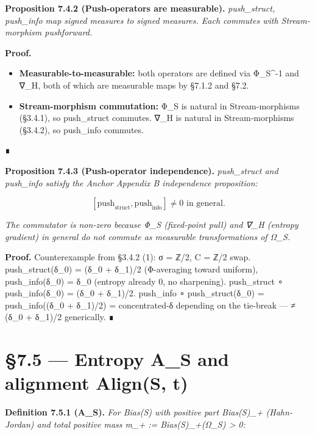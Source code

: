 \documentclass[11pt, openany]{book}
\newcommand{\sectionbreak}{\clearpage}
\begin{document}
\textbf{Proposition 7.4.2 (Push-operators are measurable).} \textit{push\_\allowbreak{}struct, push\_\allowbreak{}info map signed measures to signed measures. Each commutes with Stream-morphism pushforward.}

\textbf{Proof.}
\begin{itemize}
\item \textbf{Measurable-to-measurable:} both operators are defined via Φ\_\allowbreak{}S\textasciicircum{}{-1} and ∇\_\allowbreak{}H, both of which are measurable maps by §7.1.2 and §7.2.
\item \textbf{Stream-morphism commutation:} Φ\_\allowbreak{}S is natural in Stream-morphisms (§3.4.1), so push\_\allowbreak{}struct commutes. ∇\_\allowbreak{}H is natural in Stream-morphisms (§3.4.2), so push\_\allowbreak{}info commutes.
\end{itemize}
∎

\textbf{Proposition 7.4.3 (Push-operator independence).} \textit{push\_\allowbreak{}struct and push\_\allowbreak{}info satisfy the Anchor Appendix B independence proposition:}

\[
[\mathrm{push}_\mathrm{struct}, \mathrm{push}_\mathrm{info}] \neq 0 \text{ in general.}
\]

\textit{The commutator is non-zero because Φ\_\allowbreak{}S (fixed-point pull) and ∇\_\allowbreak{}H (entropy gradient) in general do not commute as measurable transformations of Ω\_\allowbreak{}S.}

\textbf{Proof.} Counterexample from §3.4.2 (1): σ = ℤ/2, C = ℤ/2 swap. push\_\allowbreak{}struct(δ\_\allowbreak{}0) = (δ\_\allowbreak{}0 + δ\_\allowbreak{}1)/2 (Φ-averaging toward uniform), push\_\allowbreak{}info(δ\_\allowbreak{}0) = δ\_\allowbreak{}0 (entropy already 0, no sharpening). push\_\allowbreak{}struct ∘ push\_\allowbreak{}info(δ\_\allowbreak{}0) = (δ\_\allowbreak{}0 + δ\_\allowbreak{}1)/2. push\_\allowbreak{}info ∘ push\_\allowbreak{}struct(δ\_\allowbreak{}0) = push\_\allowbreak{}info((δ\_\allowbreak{}0 + δ\_\allowbreak{}1)/2) = concentrated-δ depending on the tie-break --- ≠ (δ\_\allowbreak{}0 + δ\_\allowbreak{}1)/2 generically. ∎

\sectionbreak

\section{§7.5 --- Entropy A\_\allowbreak{}S and alignment Align(S, t)}

\textbf{Definition 7.5.1 (A\_\allowbreak{}S).} \textit{For Bias(S) with positive part Bias(S)\_\allowbreak{}+ (Hahn-Jordan) and total positive mass m\_\allowbreak{}+ := Bias(S)\_\allowbreak{}+(Ω\_\allowbreak{}S) > 0:}
\end{document}
